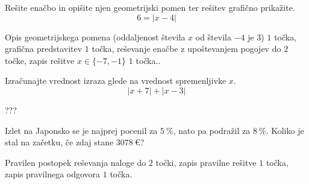 \documentclass[addpoints]{exam}
\begin{document}
\begin{questions}
    \question[5]
    Rešite enačbo in opišite njen geometrijski pomen ter rešitev grafično prikažite.
    $$  6=\left\lvert x-4\right\rvert $$
    
    
    \begin{solution}[8cm]
        Opis geometrijskega pomena (oddaljenost števila $x$ od števila $-4$ je $3$) $1$ točka, grafična predstavitev $1$ točka, reševanje enačbe z upoštevanjem pogojev do $2$ točke, zapis rešitve $x\in\{-7,-1\}$ $1$ točka..
    \end{solution}


    \newpage


    \question[5]
    Izračunajte vrednost izraza glede na vrednost spremenljivke $x$.
    $$\left\lvert x+7 \right\rvert + \left\lvert x-3 \right\rvert $$
    
    
    \begin{solution}[10cm]
        ???
    \end{solution}



    
    




    \question[4]
    Izlet na Japonsko se je najprej pocenil za $5~\%$, nato pa podražil za $8~\%$. 
    Koliko je stal na začetku, če zdaj stane $3078~€$?
    
    
    \begin{solution}[3cm]
        Pravilen postopek reševanja naloge do $2$ točki, zapis pravilne rešitve $1$ točka, zapis pravilnega odgovora $1$ točka.
    \end{solution}

     \newpage



    

\end{questions}
\end{document}
